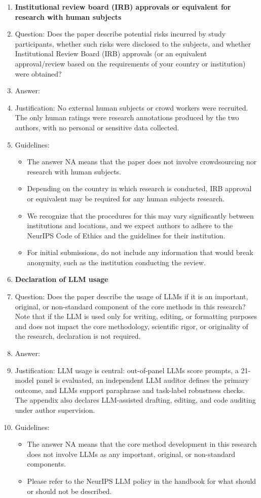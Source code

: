 \begin{enumerate}
\item {\bf Institutional review board (IRB) approvals or equivalent for research with human subjects}
    \item[] Question: Does the paper describe potential risks incurred by study participants, whether such risks were disclosed to the subjects, and whether Institutional Review Board (IRB) approvals (or an equivalent approval/review based on the requirements of your country or institution) were obtained?
    \item[] Answer: \answerNA{}
    \item[] Justification: No external human subjects or crowd workers were recruited. The only human ratings were research annotations produced by the two authors, with no personal or sensitive data collected.
    \item[] Guidelines:
    \begin{itemize}
        \item The answer NA means that the paper does not involve crowdsourcing nor research with human subjects.
        \item Depending on the country in which research is conducted, IRB approval or equivalent may be required for any human subjects research.
        \item We recognize that the procedures for this may vary significantly between institutions and locations, and we expect authors to adhere to the NeurIPS Code of Ethics and the guidelines for their institution.
        \item For initial submissions, do not include any information that would break anonymity, such as the institution conducting the review.
    \end{itemize}

\item {\bf Declaration of LLM usage}
    \item[] Question: Does the paper describe the usage of LLMs if it is an important, original, or non-standard component of the core methods in this research? Note that if the LLM is used only for writing, editing, or formatting purposes and does not impact the core methodology, scientific rigor, or originality of the research, declaration is not required.
    \item[] Answer: \answerYes{}
    \item[] Justification: LLM usage is central: out-of-panel LLMs score prompts, a 21-model panel is evaluated, an independent LLM auditor defines the primary outcome, and LLMs support paraphrase and task-label robustness checks. The appendix also declares LLM-assisted drafting, editing, and code auditing under author supervision.
    \item[] Guidelines:
    \begin{itemize}
        \item The answer NA means that the core method development in this research does not involve LLMs as any important, original, or non-standard components.
        \item Please refer to the NeurIPS LLM policy in the handbook for what should or should not be described.
    \end{itemize}

\end{enumerate}
